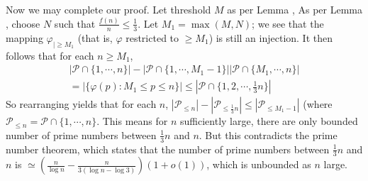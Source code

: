 \documentclass[11pt,a4paper]{article}
\begin{document}
\begin{enumerate}
    Now we may complete our proof. Let threshold $M$ as per Lemma , 
    As per Lemma , choose $N$ such that $\frac{f(n)}{n}\le \frac 13$. 
    Let $M_1=\max(M, N)$; we see that the mapping $\varphi_{\mid \ge M_1}$ (that is, $\varphi$ restricted to $\ge M_1$) is still an injection. 
    It then follows that for each $n\ge M_1$, 
    \begin{equation}
    	\begin{aligned}
    		|\mathcal{P}\cap \{1, \cdots, n\}| 
    		- |\mathcal{P}\cap \{1, \cdots, M_1 - 1\}| 
    		|\mathcal{P}\cap \{M_1, \cdots, n\}| \\
    		= |\{\varphi(p): M_1\le p\le n\}|
    		\le |\mathcal{P}\cap \{1, 2, \cdots, \frac 13 n\}|
    	\end{aligned}    	
    \end{equation}
    So rearranging yields that for each $n$, 
    $|\mathcal{P}_{\le n}| - |\mathcal{P}_{\le \frac13 n}|\le |\mathcal{P}_{\le M_1 - 1}|$ 
    (where $\mathcal{P}_{\le n}=\mathcal{P}\cap\{1, \cdots, n\}$. 
    This means for $n$ sufficiently large, there are only bounded number of prime numbers between $\frac 13n$ and $n$. 
    But this contradicts the prime number theorem, which states that the number of prime numbers between $\frac 13 n$ and $n$ is $\simeq (\frac{n}{\log n} - \frac{n}{3(\log n - \log 3)})(1 + o(1))$, which is unbounded as $n$ large.  
    
	\end{enumerate}
\end{document}
